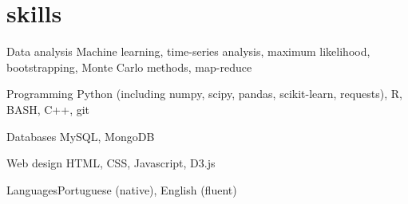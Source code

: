 
\section{skills}

\begin{entrylist}


\minientry
{Data analysis}
{Machine learning, time-series analysis, maximum likelihood, bootstrapping, Monte Carlo methods, map-reduce}


\minientry
{Programming}
{Python (including numpy, scipy, pandas, scikit-learn, requests), R, BASH, C++, git}


\minientry
{Databases}
{MySQL, MongoDB}


\minientry
{Web design}
{HTML, CSS, Javascript, D3.js}


\minientry
{Languages}{Portuguese (native), English (fluent)}

\end{entrylist}
